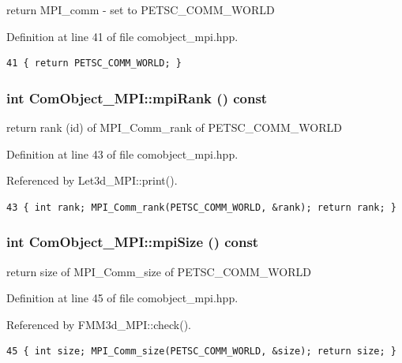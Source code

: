 return MPI\_\-comm - set to PETSC\_\-COMM\_\-WORLD 

Definition at line 41 of file comobject\_\-mpi.hpp.

\footnotesize\begin{verbatim}41 { return PETSC_COMM_WORLD; }
\end{verbatim}\normalsize 


\subsubsection{\setlength{\rightskip}{0pt plus 5cm}int Com\-Object\_\-MPI::mpi\-Rank () const\hspace{0.3cm}{\tt  [inline]}}\label{classComObject__MPI_ae51fcdfaec9ca26c842280cf6b99aa9_ae51fcdfaec9ca26c842280cf6b99aa9}


return rank (id) of MPI\_\-Comm\_\-rank of PETSC\_\-COMM\_\-WORLD 

Definition at line 43 of file comobject\_\-mpi.hpp.

Referenced by Let3d\_\-MPI::print().

\footnotesize\begin{verbatim}43 { int rank; MPI_Comm_rank(PETSC_COMM_WORLD, &rank); return rank; }
\end{verbatim}\normalsize 


\subsubsection{\setlength{\rightskip}{0pt plus 5cm}int Com\-Object\_\-MPI::mpi\-Size () const\hspace{0.3cm}{\tt  [inline]}}\label{classComObject__MPI_1cb28464592687ed96a57c17cd3e0773_1cb28464592687ed96a57c17cd3e0773}


return size of MPI\_\-Comm\_\-size of PETSC\_\-COMM\_\-WORLD 

Definition at line 45 of file comobject\_\-mpi.hpp.

Referenced by FMM3d\_\-MPI::check().

\footnotesize\begin{verbatim}45 { int size; MPI_Comm_size(PETSC_COMM_WORLD, &size); return size; }
\end{verbatim}\normalsize 


